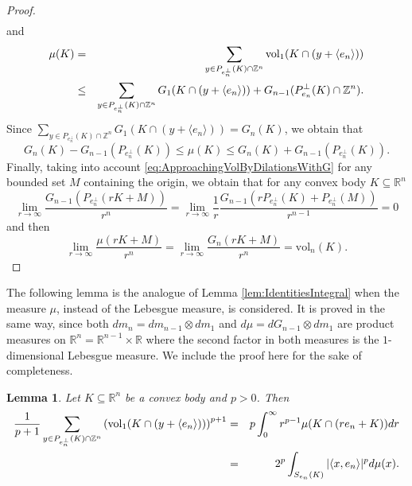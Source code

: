 \documentclass[10pt]{amsart}
\newtheorem{lemma}[thm]{Lemma}
\def\R{\mathbb{R}}
\def\Z{\mathbb{Z}}
\def\vol{\mathrm{vol}}
\numberwithin{equation}{section}
\begin{document}
\begin{proof}
\begin{eqnarray*}
\end{eqnarray*}
and
\begin{eqnarray*}
\mu(K)&=&\sum_{y\in P_{e_n^\perp}(K)\cap\Z^n}\vol_1(K\cap(y+\langle e_n\rangle))\cr
&\leq&\sum_{y\in P_{e_n^\perp}(K)\cap\Z^n} G_1(K\cap(y+\langle e_n\rangle))+G_{n-1}(P_{e_n}^\perp(K)\cap\Z^n).
\end{eqnarray*}
Since $\displaystyle{\sum_{y\in P_{e_n^\perp}(K)\cap\Z^n} G_1(K\cap(y+\langle e_n\rangle))=G_n(K)}$, we obtain that
$$
G_n(K)-G_{n-1}(P_{e_n^\perp}(K))\leq\mu(K)\leq G_n(K)+G_{n-1}(P_{e_n^\perp}(K)).
$$
Finally, taking into account \eqref{eq:ApproachingVolByDilationsWithG} for any bounded set $M$ containing the origin, we obtain that for any convex body $K\subseteq\R^n$
$$
\lim_{r\to\infty}\frac{G_{n-1}(P_{e_n^\perp}(rK+M))}{r^n}=\lim_{r\to\infty}\frac{1}{r}\frac{G_{n-1}(rP_{e_n^\perp}(K)+P_{e_n^\perp}(M))}{r^{n-1}}=0
$$
and then
$$
\lim_{r\to\infty}\frac{\mu(rK+M)}{r^n}=\lim_{r\to\infty}\frac{G_n(rK+M)}{r^n}=\vol_n(K).
$$
\end{proof}

The following lemma is the analogue of Lemma \ref{lem:IdentitiesIntegral} when the measure $\mu$, instead of the Lebesgue measure, is considered. It is proved in the same way, since both $dm_n=dm_{n-1}\otimes dm_1$ and $d\mu=dG_{n-1}\otimes dm_1$ are product measures on $\R^n=\R^{n-1}\times\R$ where the second factor in both measures is the $1$-dimensional Lebesgue measure. We include the proof here for the sake of completeness.

\begin{lemma}\label{lem:IdentitiesSum}
Let $K\subseteq\R^n$ be a convex body and $p>0$. Then
\begin{eqnarray*}
\frac{1}{p+1}\sum_{y\in P_{e_n^\perp}(K)\cap\Z^n}\left(\vol_1(K\cap (y+\langle e_n\rangle))\right)^{p+1}&=&p\int_0^{\infty}r^{p-1}\mu(K\cap(re_n+K))dr\cr
&=&2^p\int_{S_{e_n}(K)}|\langle x,e_n\rangle|^pd\mu(x).
\end{eqnarray*}
\end{lemma}
\end{document}
